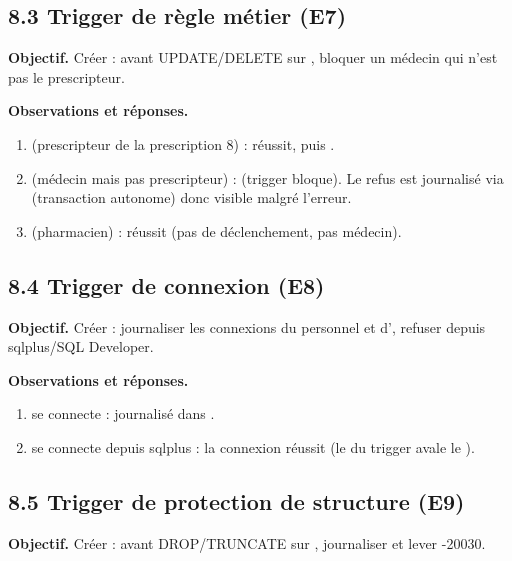 \subsection{8.3 Trigger de règle métier (E7)}
\textbf{Objectif.} Créer  : avant UPDATE/DELETE sur , bloquer un médecin qui n'est pas le prescripteur.


\textbf{Observations et réponses.}
\begin{enumerate}
  \item {} (prescripteur de la prescription 8) :  réussit, puis .
  \item {} (médecin mais pas prescripteur) :  (trigger bloque). Le refus est journalisé via  (transaction autonome) donc visible malgré l'erreur.
  \item {} (pharmacien) :  réussit (pas de déclenchement, pas médecin).
\end{enumerate}

\subsection{8.4 Trigger de connexion (E8)}
\textbf{Objectif.} Créer  : journaliser les connexions du personnel et d', refuser  depuis sqlplus/SQL Developer.


\textbf{Observations et réponses.}
\begin{enumerate}
  \item {} se connecte :  journalisé dans .
  \item {} se connecte depuis sqlplus : la connexion réussit (le  du trigger avale le ).
\end{enumerate}

\subsection{8.5 Trigger de protection de structure (E9)}
\textbf{Objectif.} Créer  : avant DROP/TRUNCATE sur , journaliser et lever -20030.

